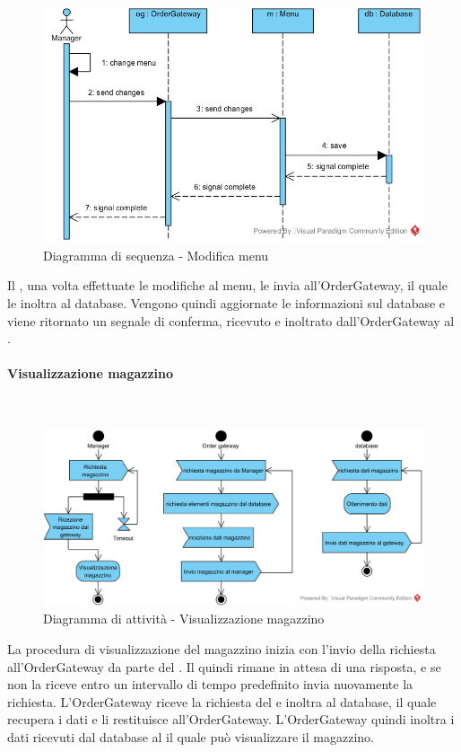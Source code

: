 \begin{figure}[H]
	\centering
	\includegraphics[width=14cm]{../../documenti/SpecificaTecnica/diagrammi_img/sequenza/direttore_modifica_menu.png}
	\caption{Diagramma di sequenza - Modifica menu}
\end{figure}
Il \Manager{}, una volta effettuate le modifiche al menu, le invia all'Order\-Gateway, il quale le inoltra al database. Vengono quindi aggiornate le informazioni sul database e viene ritornato un segnale di conferma, ricevuto e inoltrato dall'Order\-Gateway al \Manager{}.


\paragraph{Visualizzazione magazzino}\mbox{}\\
\nopagebreak
\begin{figure}[H]
	\centering
	\includegraphics[width=14cm]{diagrammi_img/attivita/manager_mag.png}
	\caption{Diagramma di attività - Visualizzazione magazzino}
\end{figure}
La procedura di visualizzazione del magazzino inizia con l'invio della richiesta all'OrderGateway da parte del \Manager{}. Il \Manager{} quindi rimane in attesa di una risposta, e se non la riceve entro un intervallo di tempo predefinito invia nuovamente la richiesta. L'OrderGateway riceve la richiesta del \Manager{} e inoltra al database, il quale recupera i dati e li restituisce all'OrderGateway. L'OrderGateway quindi inoltra i dati ricevuti dal database al \Manager{} il quale può visualizzare il magazzino.

